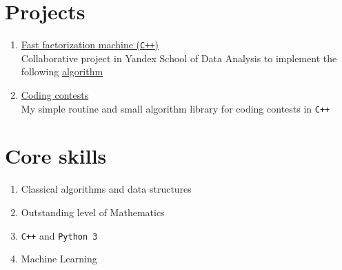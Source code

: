 \documentclass[twocolumn,10pt]{extarticle}
\begin{document}
\section{Projects}

\begin{enumerate}
\item \href{https://gitlab.com/Byobe/fast-fm-shad-2019}{Fast factorization machine (\texttt{C++})} \\
  \quad Collaborative project in Yandex School of Data Analysis to implement the following \href{https://www.csie.ntu.edu.tw/~b97053/paper/Rendle2010FM.pdf}{algorithm}
\item \href{https://github.com/deadb0d4/contest}{Coding contests} \\
  \quad My simple routine and small algorithm library for coding contests in \texttt{C++}
\end{enumerate}

\section{Core skills}

\begin{enumerate}
  \item Classical algorithms and data structures
  \item Outstanding level of Mathematics
  \item \texttt{C++} and \texttt{Python 3}
  \item Machine Learning
\end{enumerate}
\end{document}
